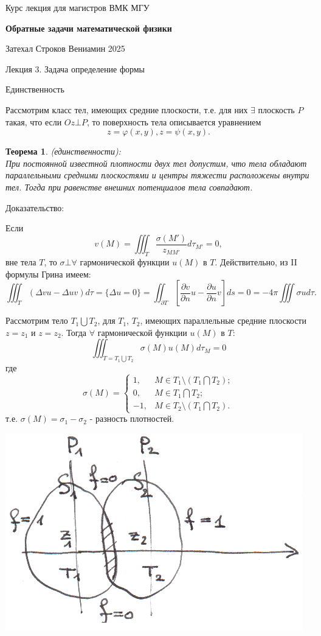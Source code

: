 \documentclass{article}
\newtheorem{theorem}{Теорема}
\begin{document}
\centerline{\large Курс лекция для магистров ВМК МГУ}
\centerline {\textbf{\LARGE Обратные задачи математической физики}}
\centerline {Затехал Строков Вениамин 2025}

\vspace{0.4cm}

\centerline{\LARGE Лекция 3. Задача определение формы}

\vspace{1cm}
\centerline{\large Единственность}

Рассмотрим класс тел, имеющих средние плоскости, т.е. для них $\exists$ плоскость $P$ такая, что если $Oz \bot P$, то поверхность тела описывается уравнением
\[
z = \varphi(x,y), z = \psi(x,y).
\]

\begin{theorem}
(единственности): \\
При постоянной известной плотности двух тел допустим, что тела обладают параллельными средними плоскостями и центры тяжести расположены внутри тел. Тогда при равенстве внешних потенциалов тела совпадают.
\end{theorem}
Доказательство:

Если
\[
v(M) = \iiint_T \dfrac{\sigma(M')}{z_{MM'}} d \tau_{M'} = 0,
\]
вне тела $T$, то $\sigma \bot \forall$ гармонической функции $u(M)$ в $T$. Действительно, из II формулы Грина имеем:
\[
\iiint_T (\Delta v u - \Delta u v) d \tau = \{\Delta u = 0\} = \iint_{\partial T} [\dfrac{\partial v}{\partial n} u - \dfrac{\partial u}{\partial n} v] ds = 0 = - 4 \pi \iiint \sigma u d\tau.
\]

Рассмотрим тело $T_1 \bigcup T_2$, для $T_1$, $T_2$, имеющих параллельные средние плоскости $z = z_1$ и $z = z_2$.
Тогда $\forall$ гармонической функции $u(M)$ в $T$:
\[
\iiint_{T = T_1 \bigcup T_2} \sigma (M) u(M) d\tau_M = 0 
\]
где
\[
\sigma(M) = 
	\begin{cases}
	1, & M \in T_1 \setminus (T_1 \bigcap T_2);\\
	0, & M \in T_1 \bigcap T_2;\\
	-1, &M \in T_2 \setminus (T_1 \bigcap T_2).
	\end{cases}
\]
т.е. $\sigma (M) = \sigma_1 - \sigma_2$ - разность плотностей.

\vspace{0.5cm}
\includegraphics[scale=0.85]{pic1.png}
\end{document}
